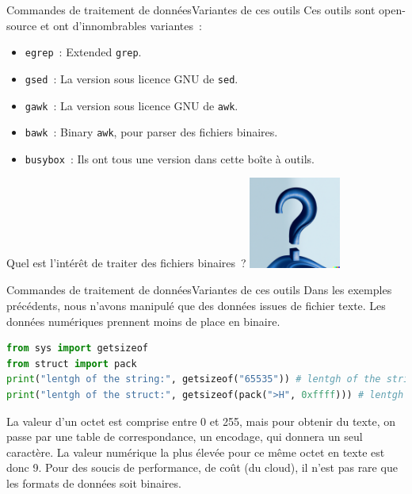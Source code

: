 \documentclass{beamer}
\begin{document}
    \begin{frame}{Commandes de traitement de données}{Variantes de ces outils}
        Ces outils sont open-source et ont d'innombrables variantes~:
        \begin{itemize}
            \item \lstinline{egrep}~: Extended \lstinline{grep}.
            \item \lstinline{gsed}~: La version sous licence GNU de \lstinline{sed}.
            \item \lstinline{gawk}~: La version sous licence GNU de \lstinline{awk}.
            \item \lstinline{bawk}~: Binary \lstinline{awk}, pour parser des fichiers binaires.
            \item \lstinline{busybox}~: Ils ont tous une version dans cette boîte à outils.
        \end{itemize}
        \bigbreak
        Quel est l'intérêt de traiter des fichiers binaires~?
        \bigbreak
        \centering
        \includegraphics[width=3cm]{image/question-mark-on-a-blank-background.png}
    \end{frame}

    \begin{frame}[fragile]{Commandes de traitement de données}{Variantes de ces outils}
        Dans les exemples précédents, nous n'avons manipulé que des données issues de fichier texte.
        Les données numériques prennent moins de place en binaire.
        \begin{lstlisting}[language=python]
from sys import getsizeof
from struct import pack
print("lentgh of the string:", getsizeof("65535")) # lentgh of the string: 46
print("lentgh of the struct:", getsizeof(pack(">H", 0xffff))) # lentgh of the struct: 35
        \end{lstlisting}
        La valeur d'un octet est comprise entre 0 et 255, mais pour obtenir du texte, on passe par une table de correspondance, un encodage, qui donnera un seul caractère.
        La valeur numérique la plus élevée pour ce même octet en texte est donc 9.
        \bigbreak
        Pour des soucis de performance, de coût (du cloud), il n'est pas rare que les formats de données soit binaires.
    \end{frame}
\end{document}
